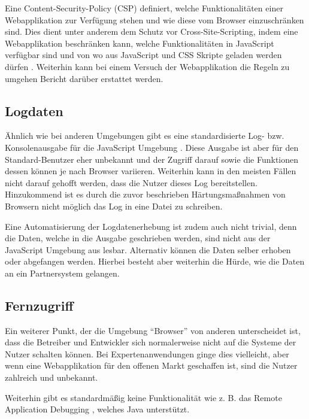 Eine Content-Security-Policy (CSP) definiert, welche Funktionalitäten einer Webapplikation zur Verfügung stehen und wie diese vom Browser einzuschränken sind. Dies dient unter anderem dem Schutz vor Cross-Site-Scripting, indem eine Webapplikation beschränken kann, welche Funktionalitäten in JavaScript verfügbar sind und von wo aus JavaScript und CSS Skripte geladen werden dürfen \cite{MDNContentSecurityPolicy}. Weiterhin kann bei einem Versuch der Webapplikation die Regeln zu umgehen Bericht darüber erstattet werden.

\subsection{Logdaten}
\label{sec:logdaten}

Ähnlich wie bei anderen Umgebungen gibt es eine standardisierte Log- bzw. Konsolenausgabe für die JavaScript Umgebung \cite{MDNConsole}. Diese Ausgabe ist aber für den Standard-Benutzer eher unbekannt und der Zugriff darauf sowie die Funktionen dessen können je nach Browser variieren. Weiterhin kann in den meisten Fällen nicht darauf gehofft werden, dass die Nutzer dieses Log bereitstellen. Hinzukommend ist es durch die zuvor beschrieben Härtungsmaßnahmen von Browsern nicht möglich das Log in eine Datei zu schreiben.

Eine Automatisierung der Logdatenerhebung ist zudem auch nicht trivial, denn die Daten, welche in die Ausgabe geschrieben werden, sind nicht aus der JavaScript Umgebung aus lesbar. Alternativ können die Daten selber erhoben oder abgefangen werden. Hierbei besteht aber weiterhin die Hürde, wie die Daten an ein Partnersystem gelangen.

\subsection{Fernzugriff}

Ein weiterer Punkt, der die Umgebung \enquote{Browser} von anderen unterscheidet ist, dass die Betreiber und Entwickler sich normalerweise nicht auf die Systeme der Nutzer schalten können. Bei Expertenanwendungen ginge dies vielleicht, aber wenn eine Webapplikation für den offenen Markt geschaffen ist, sind die Nutzer zahlreich und unbekannt.

Weiterhin gibt es standardmäßig keine Funktionalität wie z. B. das Remote Application Debugging \cite{JavaDebugWireProtocol}, welches Java unterstützt.